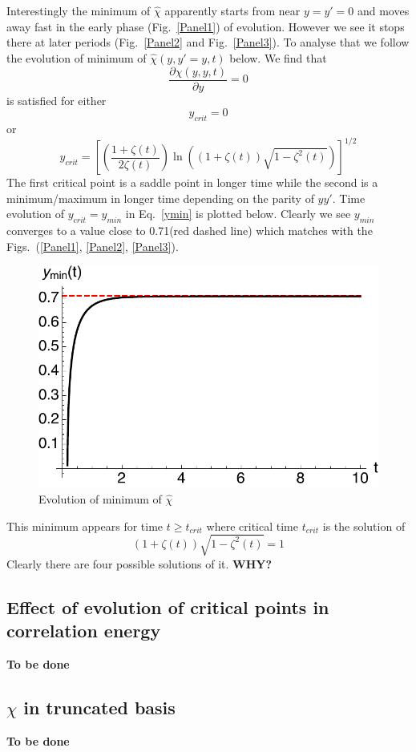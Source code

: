 \documentclass[jcp,groupaddress]{revtex4-1}
\newcommand{\eq}{\begin{equation}}
\newcommand{\qe}{\end{equation}}
\begin{document}
Interestingly the minimum of $\hat{\chi}$ apparently starts from near $y=y'=0$ and moves away fast in the early phase (Fig.~\ref{Panel1}) of evolution. However we see it stops there at later periods (Fig.~\ref{Panel2} and Fig.~\ref{Panel3}). To analyse that we follow the evolution of minimum of $\hat{\chi}(y, y'=y, t)$ below. We find that 
\eq
\frac{\partial \hat{\chi}(y, y, t)}{\partial y} = 0
\qe
is satisfied for either
\eq
y_{crit}=0
\qe
or
\eq\label{ymin}
y_{crit}= \left[ \left(\frac{1+\zeta(t)}{2\zeta(t)}\right) \ln((1+\zeta(t))\sqrt{1-\zeta^2(t)})\right]^{1/2}
\qe
The first critical point is a saddle point in longer time while the second is a minimum/maximum in longer time depending on the parity of $y y'$.
Time evolution of $y_{crit} = y_{min}$ in Eq.~\eqref{ymin} is plotted below. Clearly we see $y_{min}$ converges to a value close to 0.71(red dashed line) which matches with the Figs.~(\ref{Panel1}, \ref{Panel2}, \ref{Panel3}). 
\begin{figure}[H]
\begin{center}
   \includegraphics[scale=0.7]{plots/Yminevolution.pdf} 
  \caption{Evolution of minimum of $\hat{\chi}$}
  \label{ymin}
 \end{center}
\end{figure}  
This minimum appears for time $t \geq t_{crit}$ where critical time  $t_{crit}$ is the solution of 
\eq
(1+\zeta(t))\sqrt{1-\zeta^2(t)} = 1
\qe
Clearly there are four possible solutions of it. \textbf{WHY?}
\subsection{Effect of evolution of critical points in correlation energy}
\textbf{To be done}
\subsection{$\chi$ in truncated basis}
\textbf{To be done}
\end{document}

